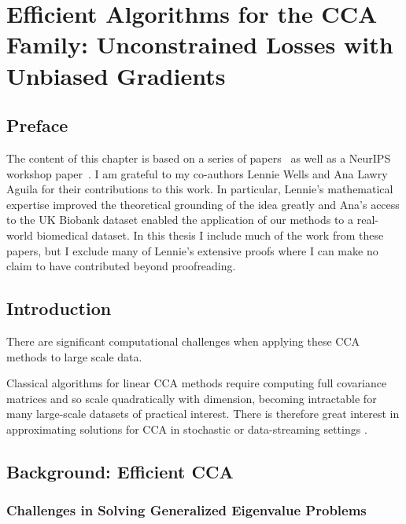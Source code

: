 \graphicspath{{chapters/gradient_descent/}}


\chapter{Efficient Algorithms for the CCA Family: Unconstrained Losses with Unbiased Gradients}\label{chap:gradient_descent}
\minitoc
\section*{Preface}
The content of this chapter is based on a series of papers~\citep{chapman2022generalized, chapman2023efficient} as well as a NeurIPS workshop paper~\citep{chapman2023neurips}.
I am grateful to my co-authors Lennie Wells and Ana Lawry Aguila for their contributions to this work.
In particular, Lennie's mathematical expertise improved the theoretical grounding of the idea greatly and Ana's access to the UK Biobank dataset enabled the application of our methods to a real-world biomedical dataset.
In this thesis I include much of the work from these papers, but I exclude many of Lennie's extensive proofs where I can make no claim to have contributed beyond proofreading.

\section{Introduction}

There are significant computational challenges when applying these CCA methods to large scale data.



Classical algorithms for linear CCA methods require computing full covariance matrices and so scale quadratically with dimension, becoming intractable for many large-scale datasets of practical interest.
There is therefore great interest in approximating solutions for CCA in stochastic or data-streaming settings \citep{arora2012stochastic}.




\section{Background: Efficient CCA}\label{sec:background-unified}

\subsection{Challenges in Solving Generalized Eigenvalue Problems}

